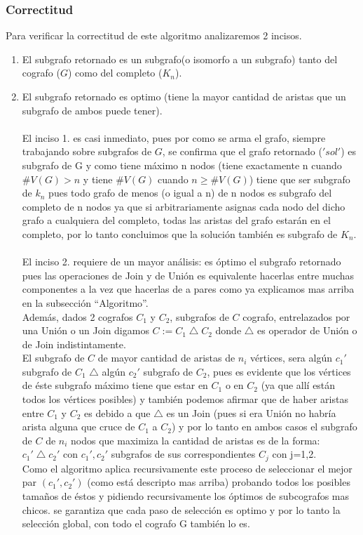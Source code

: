 \subsubsection{Correctitud}
Para verificar la correctitud de este algoritmo analizaremos 2 incisos.
\begin{enumerate}
\item El subgrafo retornado es un subgrafo(o isomorfo a un subgrafo) tanto del cografo ($G$) como del completo ($K_n$).
\item El subgrafo retornado es optimo (tiene la mayor cantidad de aristas que un subgrafo de ambos puede tener).\\
\\
El inciso 1. es casi inmediato, pues por como se arma el grafo, siempre trabajando sobre subgrafos de $G$, se confirma que el grafo retornado ($'sol'$) es subgrafo de G y como tiene máximo n nodos (tiene exactamente n cuando $\#V(G) > n$ y tiene $\#V(G)$ cuando $n \geq \#V(G)$) tiene que ser subgrafo de $k_n$ pues todo grafo de menos (o igual a n) de n nodos es subgrafo del completo de n nodos ya que si arbitrariamente asignas cada nodo del dicho grafo a cualquiera del completo, todas las aristas del grafo estarán en el completo, por lo tanto concluimos que la solución también es subgrafo de $K_n$.\\ \\
El inciso 2. requiere de un mayor análisis: es óptimo el subgrafo retornado pues las operaciones de Join y de Unión es equivalente hacerlas entre muchas componentes a la vez que hacerlas de a pares como ya explicamos mas arriba en la subsección ``Algoritmo''.\\
Además, dados 2 cografos $C_1$ y $C_2$, subgrafos de $C$ cografo, entrelazados por una Unión o un Join digamos $C:= C_1 \bigtriangleup C_2$ donde $\bigtriangleup$ es operador de Unión o de Join indistintamente.\\
El subgrafo de $C$ de mayor cantidad de aristas de $n_i$ vértices, sera algún $c_1'$ subgrafo de $C_1$ $\bigtriangleup$ algún $c_2'$ subgrafo de $C_2$, pues es evidente que los vértices de éste subgrafo máximo tiene que estar en $C_1$ o en $C_2$ (ya que allí están todos los vértices posibles) y también podemos afirmar que de haber aristas entre $C_1$ y $C_2$ es debido a que $\bigtriangleup$ es un Join (pues si era Unión no habría arista alguna que cruce de $C_1$ a $C_2$) y por lo tanto en ambos casos el subgrafo de $C$ de $n_i$ nodos que maximiza la cantidad de aristas es de la forma:
$c_1' \bigtriangleup c_2'$ con $c_1',c_2'$ subgrafos de sus correspondientes $C_j$  con j=1,2.\\
Como el algoritmo aplica recursivamente este proceso de seleccionar el mejor par $(c_1',c_2')$ (como está descripto mas arriba) probando todos los posibles tamaños de éstos y pidiendo recursivamente los óptimos de subcografos mas chicos. se garantiza que cada paso de selección es optimo y por lo tanto la selección global, con todo el cografo G también lo es. 

\end{enumerate}

